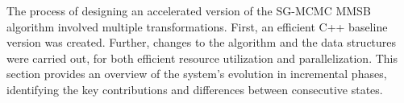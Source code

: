 
The process of designing an accelerated version of the SG-MCMC MMSB algorithm
involved multiple transformations. First, an efficient C++ baseline version
was created. Further, changes to the algorithm and the data structures
were carried out, for both efficient resource utilization and parallelization.
This section provides an overview of the system's evolution in incremental
phases, identifying the key contributions and differences between consecutive
states.




